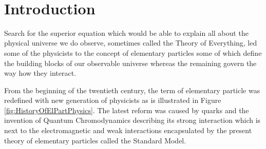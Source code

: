 \documentclass[a4paper,11pt,twoside,openright]{book}
\begin{document}
\newpage 
\thispagestyle{empty}  
~

\clearpage
{}
\setcounter{page}{1}
\tableofcontents 

\clearpage
{}
\listoftables

\clearpage
{}
\listoffigures

\cleardoublepage

\clearpage
{}
\setcounter{page}{1}

\chapter*{Introduction}

Search for the superior equation which would be able to explain all about the
physical universe we do observe, sometimes called the Theory of Everything, led
some of the physicists to the concept of elementary particles some of which define the
building blocks of our observable universe whereas the remaining govern the way how
they interact. 

From the beginning of the twentieth century, the term of elementary particle
was redefined with new generation of physicists as is illustrated in Figure
\ref{fig:HistoryOfElPartPhysics}. The latest reform was caused by quarks and the
invention of Quantum Chromodynamics describing its strong interaction which is
next to the electromagnetic and weak interactions encapsulated by the present
theory of elementary particles called the Standard Model. 
\end{document}
